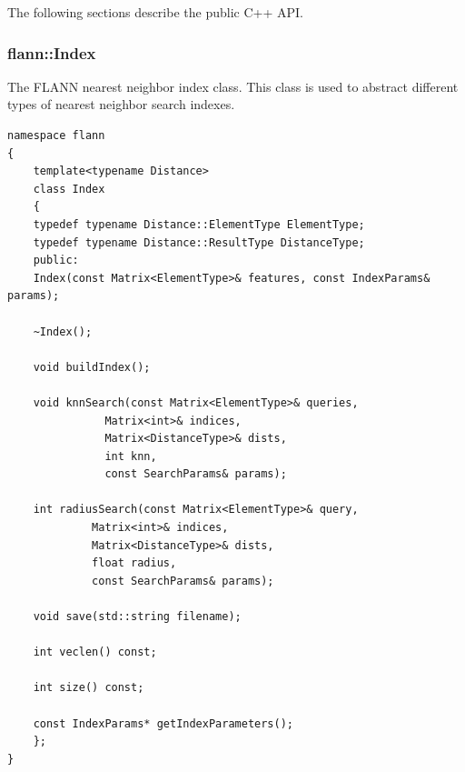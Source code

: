 \documentclass[letter,10pt]{article}
\begin{document}
The following sections describe the public C++ API.

\subsubsection{flann::Index}
\label{sec:flann::Index}
The FLANN nearest neighbor index class. This class is used to abstract different
types of nearest neighbor search indexes.

\begin{Verbatim}[fontsize=\footnotesize,frame=single]
namespace flann
{
    template<typename Distance>
    class Index 
    {
	typedef typename Distance::ElementType ElementType;
	typedef typename Distance::ResultType DistanceType;
    public:
	Index(const Matrix<ElementType>& features, const IndexParams& params);

	~Index();

	void buildIndex();

	void knnSearch(const Matrix<ElementType>& queries, 
		       Matrix<int>& indices, 
		       Matrix<DistanceType>& dists, 
		       int knn, 
		       const SearchParams& params);

	int radiusSearch(const Matrix<ElementType>& query, 
			 Matrix<int>& indices, 
			 Matrix<DistanceType>& dists, 
			 float radius, 
			 const SearchParams& params);

	void save(std::string filename);

	int veclen() const;

	int size() const;

	const IndexParams* getIndexParameters();
    };
}
\end{Verbatim}
\end{document}
